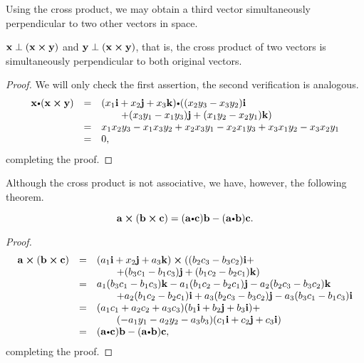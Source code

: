 Using the cross product, we may obtain a third vector simultaneously perpendicular to two other vectors in space.
\begin{thm}
$\mathbf{  x}\perp (\mathbf{  x} \boldsymbol\times\mathbf{  y}) $ and
$\mathbf{  y}\perp (\mathbf{  x} \boldsymbol\times\mathbf{  y})$, that
is, the cross product of two vectors is simultaneously perpendicular
to both original vectors.
\end{thm}
\begin{proof}
We will only check the first assertion, the second verification is
analogous.
$$\begin{array}{lll}
\vector{ x}\bp(\crossprod{ x}{y}) & = &
(x_1\vector{i} + x_2 \vector{j} + x_3\vector{k})\bp ((x_2y_3 - x_3y_2 )\vector{i} \\
& & \qquad + (x_3y_1 - x_1y_3 )\vector{j} + (x_1y_2 -
x_2y_1 )\vector{k} ) \\
& = & x_1x_2y_3 - x_1x_3y_2 + x_2x_3y_1 - x_2x_1y_3 + x_3x_1y_2 -
x_3x_2y_1 \\
 & = & 0,
\end{array}$$
completing the proof.
\end{proof}
Although the cross product is not associative, we have, however, the
following theorem.
\begin{thm}
$$\vector{ a}\cross (\crossprod{\mathbf b}{c}) = (\dotprod{\mathbf a}{c})\vector{ b} - (\dotprod{\mathbf a}{\mathbf b})\vector{c}.$$
\end{thm}
\begin{proof}
$$\begin{array}{lll}
\vector{ a}\cross (\crossprod{\mathbf b}{c}) & = &
(a_1\vector{i} + x_2 \vector{j} + a_3\vector{k})\cross ((b_2c_3 - b_3c_2 )\vector{i} +   \\
& & \qquad  + (b_3c_1 - b_1c_3)\vector{j} + (b_1c_2 -
b_2c_1)\vector{k} ) \\
& = &   a_1(b_3c_1 - b_1c_3)\vector{k} - a_1(b_1c_2 -
b_2c_1)\vector{j} - a_2(b_2c_3 - b_3c_2 )\vector{k}\\
&  & \qquad + a_2(b_1c_2 - b_2c_1)\vector{i} + a_3(b_2c_3 - b_3c_2
)\vector{j} - a_3(b_3c_1 - b_1c_3)\vector{i} \\
& = & (a_1c_1 + a_2c_2 + a_3c_3)(b_1\vector{i} + b_2\vector{j} +
b_3\vector{i}) + \\
& & \qquad
(-a_1y_1- a_2y_2 - a_3b_3)(c_1\vector{i} + c_2\vector{j} + c_3\vector{i})\\
 & = &  (\dotprod{\mathbf a}{c})\vector{ b} - (\dotprod{\mathbf a}{\mathbf b})\vector{c}, \\
\end{array}$$
completing the proof.
\end{proof}


